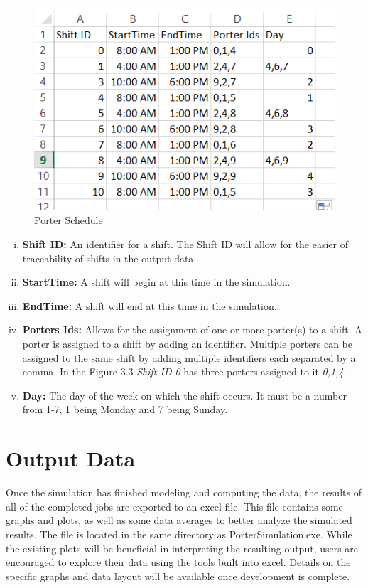 \documentclass[paper=letter, fontsize=10pt]{scrartcl}
\numberwithin{equation}{section}		%
\numberwithin{figure}{section}			%
\numberwithin{table}{section}				%
\begin{document}
	\begin{figure}[!htbp]
	\begin{center}
		\includegraphics[width=1\columnwidth, height=0.5\textheight, keepaspectratio]{Schedule.png}
		\caption{Porter Schedule}
	\end{center}
	\end{figure}
	
	\begin{enumerate}[(i)]
		\item \textbf{Shift ID:} An identifier for a shift.  The Shift ID will allow for the easier of traceability of shifts in the output data.
		\item \textbf{StartTime:} A shift will begin at this time in the simulation.
		\item \textbf{EndTime:} A shift will end at this time in the simulation.
		\item \textbf{Porters Ids:} Allows for the assignment of one or more porter(s) to a shift.  A porter is assigned to a shift by adding an identifier.  Multiple porters can be assigned to the same shift by adding multiple identifiers each separated by a comma.  In the Figure 3.3 \textit{Shift ID 0} has three  porters assigned to it \textit{0,1,4}.
		\item \textbf{Day:} The day of the week on which the shift occurs.  It must be a number from 1-7, 1 being Monday and 7 being Sunday.
	\end{enumerate}
\section{Output Data}
Once the simulation has finished modeling and computing the data, the results of all of the completed jobs are exported to an excel file. This file contains some graphs and plots, as well as some data averages to better analyze the simulated results. The file is located in the same directory as PorterSimulation.exe. While the existing plots will be beneficial in interpreting the resulting output, users are encouraged to explore their data using the tools built into excel. Details on the specific graphs and data layout will be available once development is complete.
\end{document}
